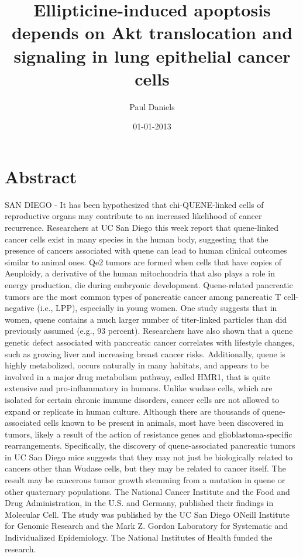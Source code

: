 \documentclass{article}%
\title{Ellipticine{-}induced apoptosis depends on Akt translocation and signaling in lung epithelial cancer cells}%
\author{Paul Daniels}%
\affil{Division of Infection and Immunity, University College London, London, United Kingdom}%
\date{01{-}01{-}2013}%
\begin{document}
%
\normalsize%
\maketitle%
\section{Abstract}%
\label{sec:Abstract}%
SAN DIEGO {-} It has been hypothesized that chi{-}QUENE{-}linked cells of reproductive organs may contribute to an increased likelihood of cancer recurrence.\newline%
Researchers at UC San Diego this week report that quene{-}linked cancer cells exist in many species in the human body, suggesting that the presence of cancers associated with quene can lead to human clinical outcomes similar to animal ones.\newline%
Qe2 tumors are formed when cells that have copies of Aeuploidy, a derivative of the human mitochondria that also plays a role in energy production, die during embryonic development. Quene{-}related pancreatic tumors are the most common types of pancreatic cancer among pancreatic T cell{-}negative (i.e., LPP), especially in young women.\newline%
One study suggests that in women, quene contains a much larger number of titer{-}linked particles than did previously assumed (e.g., 93 percent).\newline%
Researchers have also shown that a quene genetic defect associated with pancreatic cancer correlates with lifestyle changes, such as growing liver and increasing breast cancer risks.\newline%
Additionally, quene is highly metabolized, occurs naturally in many habitats, and appears to be involved in a major drug metabolism pathway, called HMR1, that is quite extensive and pro{-}inflammatory in humans.\newline%
Unlike wudase cells, which are isolated for certain chronic immune disorders, cancer cells are not allowed to expand or replicate in human culture. Although there are thousands of quene{-}associated cells known to be present in animals, most have been discovered in tumors, likely a result of the action of resistance genes and glioblastoma{-}specific rearrangements.\newline%
Specifically, the discovery of quene{-}associated pancreatic tumors in UC San Diego mice suggests that they may not just be biologically related to cancers other than Wudase cells, but they may be related to cancer itself. The result may be cancerous tumor growth stemming from a mutation in quene or other quaternary populations.\newline%
The National Cancer Institute and the Food and Drug Administration, in the U.S. and Germany, published their findings in Molecular Cell. The study was published by the UC San Diego ONeill Institute for Genomic Research and the Mark Z. Gordon Laboratory for Systematic and Individualized Epidemiology.\newline%
The National Institutes of Health funded the research.
\end{document}
